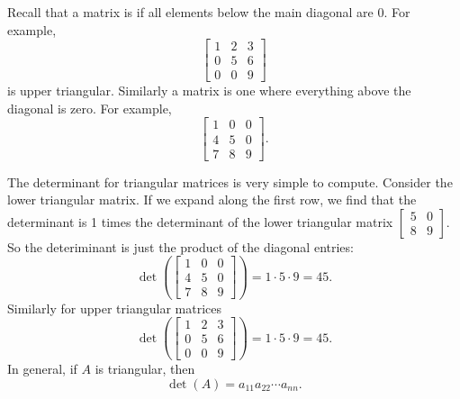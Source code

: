 \documentclass{ximera}
\begin{document}
Recall that a matrix is \emph{} if all elements below the main diagonal are 0.  For example,
\begin{equation*}
    \begin{bmatrix}
        1 & 2 & 3 \\
        0 & 5 & 6 \\
        0 & 0 & 9
    \end{bmatrix}
\end{equation*}
is upper triangular.  Similarly a \emph{} matrix is one where everything above the diagonal is zero.  For example,
\begin{equation*}
    \begin{bmatrix}
        1 & 0 & 0 \\
        4 & 5 & 0 \\
        7 & 8 & 9
    \end{bmatrix} .
\end{equation*}

The determinant for triangular matrices is very simple to compute. Consider the lower triangular matrix.  If we expand along the first row, we find that the determinant is 1 times the determinant of the lower triangular matrix $\left[ \begin{smallmatrix} 5 & 0 \\ 8 & 9 \end{smallmatrix} \right]$.  So the deteriminant is just the product of the diagonal entries:
\begin{equation*}
    \det 
    \left(
        \begin{bmatrix}
            1 & 0 & 0 \\
            4 & 5 & 0 \\
            7 & 8 & 9
        \end{bmatrix} 
    \right)
    = 1 \cdot 5 \cdot 9 = 45 .
\end{equation*}
Similarly for upper triangular matrices
\begin{equation*}
    \det \left(
        \begin{bmatrix}
            1 & 2 & 3 \\
            0 & 5 & 6 \\
            0 & 0 & 9
        \end{bmatrix}
    \right)
    = 1 \cdot 5 \cdot 9 = 45 .
\end{equation*}
In general, if $A$ is triangular, then
\begin{equation*}
    \det (A) = a_{11} a_{22} \cdots a_{nn} .
\end{equation*}
\end{document}
